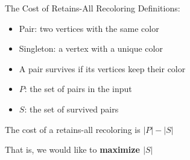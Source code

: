 \begin{frame}{The Cost of Retains-All Recoloring}
Definitions:
\begin{itemize}

\pause\item
\alert{Pair}: two vertices with the same color

\pause\item
\alert{Singleton}: a vertex with a unique color

\pause\item
A pair \alert{survives} if its vertices keep their color

\pause\item
\alert{$P$}: the set of pairs in the input  

\pause\item
\alert{$S$}: the set of survived pairs

\end{itemize}

\pause\begin{observation}
The cost of a retains-all recoloring is $|P| - |S|$
\end{observation}

\pause
That is, we would like to \textbf{maximize $|S|$}

\end{frame}